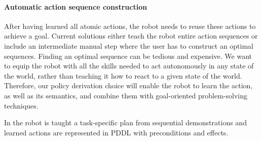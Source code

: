 \paragraph{Automatic action sequence construction}
After having learned all atomic actions, the robot needs to reuse these actions to achieve a goal.
Current solutions either teach the robot entire action sequences or include an intermediate manual step where the user has to construct an optimal sequences.
Finding an optimal sequence can be tedious and expensive.
We want to equip the robot with all the skills needed to act autonomously in any state of the world, rather than teaching it how to react to a given state of the world.
Therefore, our policy derivation choice will enable the robot to learn the action, as well as its semantics, and combine them with goal-oriented problem-solving techniques.


In \cite{veeraraghavan2008teaching} the robot is taught a task-specific plan from sequential demonstrations and  learned actions are represented in PDDL with preconditions and effects.